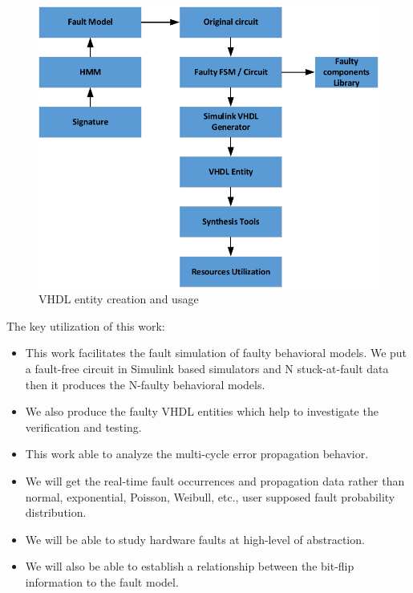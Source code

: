 %
\begin{figure}[tb!]
 \centering
  \captionsetup{justification=centering}    
   \includegraphics[scale=0.8]{Figures/library.pdf}
   \caption{VHDL entity creation and usage}
\label{fig:library1}
\end{figure}

%
%
The key utilization of this work:
\begin{itemize}
\item This work facilitates the fault simulation of faulty behavioral models. We put a fault-free circuit in Simulink based simulators and N stuck-at-fault data then it produces the N-faulty behavioral models.
\item We also produce the faulty VHDL entities which help to investigate the verification and testing.
\item This work able to analyze the multi-cycle error propagation behavior.
\item We will get the real-time fault occurrences and propagation data rather than normal, exponential, Poisson, Weibull, etc., user supposed fault probability distribution.
\item We will be able to study hardware faults at high-level of abstraction.
\item We will also be able to establish a relationship between the bit-flip information to the fault model.
\end{itemize}

